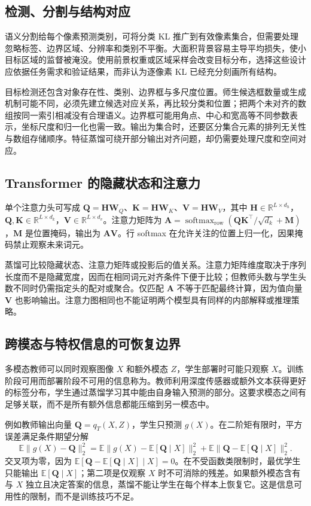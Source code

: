 \documentclass[UTF8,12pt,a4paper,fontset=fandol]{ctexart}
\begin{document}
\subsection{检测、分割与结构对应}
语义分割给每个像素预测类别，可将分类 KL 推广到有效像素集合，但需要处理忽略标签、边界区域、分辨率和类别不平衡。大面积背景容易主导平均损失，使小目标区域的监督被淹没。使用前景权重或区域采样会改变目标分布，选择这些设计应依据任务需求和验证结果，而非认为逐像素 KL 已经充分刻画所有结构。

目标检测还包含对象存在性、类别、边界框与多尺度位置。师生候选框数量或生成机制可能不同，必须先建立候选对应关系，再比较分类和位置；把两个未对齐的数组按同一索引相减没有合理语义。边界框可能用角点、中心和宽高等不同参数表示，坐标尺度和归一化也需一致。输出为集合时，还要区分集合元素的排列无关性与数组存储顺序。特征蒸馏可绕开部分输出对齐问题，却仍需要处理尺度和空间对应。

\subsection{Transformer 的隐藏状态和注意力}
单个注意力头可写成 $\mathbf Q=\mathbf H\mathbf W_Q$、$\mathbf K=\mathbf H\mathbf W_K$、$\mathbf V=\mathbf H\mathbf W_V$，其中 $\mathbf H\in\mathbb R^{L\times d_h}$，$\mathbf Q,\mathbf K\in\mathbb R^{L\times d_k}$，$\mathbf V\in\mathbb R^{L\times d_v}$。注意力矩阵为 $\mathbf A=\operatorname{softmax}_{\mathrm{row}}(\mathbf Q\mathbf K^\top/\sqrt{d_k}+\mathbf M)$，$\mathbf M$ 是位置掩码，输出为 $\mathbf A\mathbf V$。行 softmax 在允许关注的位置上归一化，因果掩码禁止观察未来词元。

蒸馏可比较隐藏状态、注意力矩阵或投影后的值关系。注意力矩阵维度取决于序列长度而不是隐藏宽度，因而在相同词元对齐条件下便于比较；但教师头数与学生头数不同时仍需指定头的配对或聚合。仅匹配 $\mathbf A$ 不等于匹配最终计算，因为值向量 $\mathbf V$ 也影响输出。注意力图相同也不能证明两个模型具有同样的内部解释或推理策略。

\subsection{跨模态与特权信息的可恢复边界}
多模态教师可以同时观察图像 $X$ 和额外模态 $Z$，学生部署时可能只观察 $X$。训练阶段可用而部署阶段不可用的信息称为。教师利用深度传感器或额外文本获得更好的标签分布，学生通过蒸馏学习其中能由自身输入预测的部分。这要求模态之间有足够关联，而不是所有额外信息都能压缩到另一模态中。

例如教师输出向量 $\mathbf Q=q_T(X,Z)$，学生只预测 $g(X)$。在二阶矩有限时，平方误差满足条件期望分解
\[
 \mathbb E\|g(X)-\mathbf Q\|_2^2
 =\mathbb E\|g(X)-\mathbb E[\mathbf Q\mid X]\|_2^2
 +\mathbb E\|\mathbf Q-\mathbb E[\mathbf Q\mid X]\|_2^2.
\]
交叉项为零，因为 $\mathbb E[\mathbf Q-\mathbb E[\mathbf Q\mid X]\mid X]=0$。在不受函数类限制时，最优学生只能输出 $\mathbb E[\mathbf Q\mid X]$；第二项是仅观察 $X$ 时不可消除的残差。如果额外模态含有与 $X$ 独立且决定答案的信息，蒸馏不能让学生在每个样本上恢复它。这是信息可用性的限制，而不是训练技巧不足。
\end{document}
